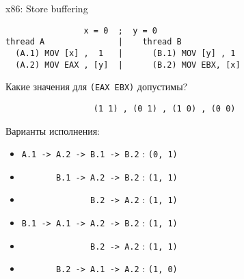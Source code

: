 \begin{frame}{x86: Store buffering}

\begin{adjustbox}{width=\textwidth,height=2cm,keepaspectratio}
\begin{lstlisting}
                x = 0  ;  y = 0
thread A               |    thread B          
  (A.1) MOV [x] ,  1   |      (B.1) MOV [y] , 1  
  (A.2) MOV EAX , [y]  |      (B.2) MOV EBX, [x] 
\end{lstlisting}
\end{adjustbox}

Какие значения для \texttt{(EAX EBX)} допустимы?

\texttt{\ \ \ \ \ \ \ \ \ \ \ \ \ \ \ \ \ \ (1 1)\ , (0 1)\ , (1 0)\ , (0 0)}

Варианты исполнения:
\begin{itemize}
    \item \texttt{A.1 -> A.2 -> B.1 -> B.2}                            : \texttt{(0, 1)}
    \item \texttt{\ \ \ \ \ \ \       B.1 -> A.2 -> B.2}               : \texttt{(1, 1)}
    \item \texttt{\ \ \ \ \ \ \ \ \ \ \ \ \ \              B.2 -> A.2} : \texttt{(1, 1)}
    \item \texttt{B.1 -> A.1 -> A.2 -> B.2}                            : \texttt{(1, 1)}
    \item \texttt{\ \ \ \ \ \ \ \ \ \ \ \ \ \              B.2 -> A.2} : \texttt{(1, 1)}
    \item \texttt{\ \ \ \ \ \ \       B.2 -> A.1 -> A.2}               : \texttt{(1, 0)}
\end{itemize}
\end{frame}

